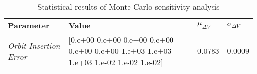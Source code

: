 
                    \begin{table}[]
                    \centering
                    \begin{tabular}{l l l l}
                    \rowcolor[HTML]{EFEFEF} \textbf{Parameter} & \textbf{Value} & \textbf{$\mu_{\Delta V}$} & \textbf{$\sigma_{\Delta V}$} \\
                    \textit{Orbit Insertion Error} & [0.e+00 0.e+00 0.e+00 0.e+00 0.e+00 0.e+00 1.e+03 1.e+03 1.e+03 1.e-02
 1.e-02 1.e-02] & 0.0783 & 0.0009 \\

                    \end{tabular}
                    \caption{Statistical results of Monte Carlo sensitivity analysis}
                    \label{tab:SensitivityAnalysis}
                    \end{table}
                    